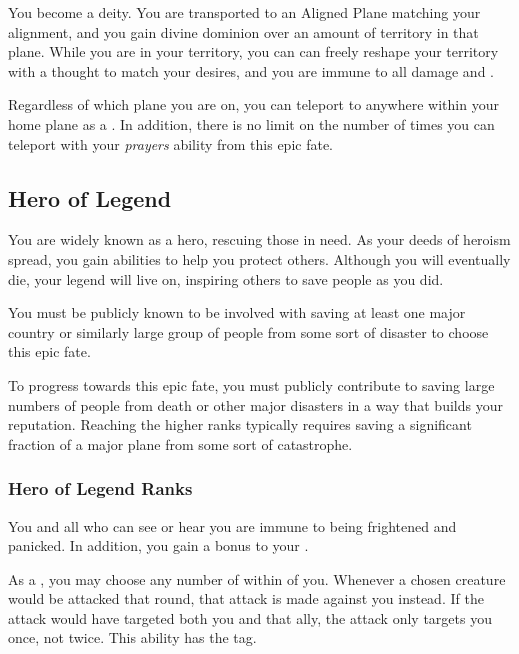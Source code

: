        You become a deity.
      You are transported to an Aligned Plane matching your alignment, and you gain divine dominion over an amount of territory in that plane.
      While you are in your territory, you can can freely reshape your territory with a thought to match your desires, and you are immune to all damage and .

      Regardless of which plane you are on, you can teleport to anywhere within your home plane as a .
      In addition, there is no limit on the number of times you can teleport with your \textit{prayers} ability from this epic fate.

  \subsection{Hero of Legend}
    You are widely known as a hero, rescuing those in need.
    As your deeds of heroism spread, you gain abilities to help you protect others.
    Although you will eventually die, your legend will live on, inspiring others to save people as you did.

     You must be publicly known to be involved with saving at least one major country or similarly large group of people from some sort of disaster to choose this epic fate.

     To progress towards this epic fate, you must publicly contribute to saving large numbers of people from death or other major disasters in a way that builds your reputation.
    Reaching the higher ranks typically requires saving a significant fraction of a major plane from some sort of catastrophe.

    \subsubsection{Hero of Legend Ranks}
       You and all  who can see or hear you are immune to being frightened and panicked.
      In addition, you gain a  bonus to your .

       As a , you may choose any number of  within \shortrange of you.
      Whenever a chosen creature would be attacked that round, that attack is made against you instead.
      If the attack would have targeted both you and that ally, the attack only targets you once, not twice.
      This ability has the  tag.

